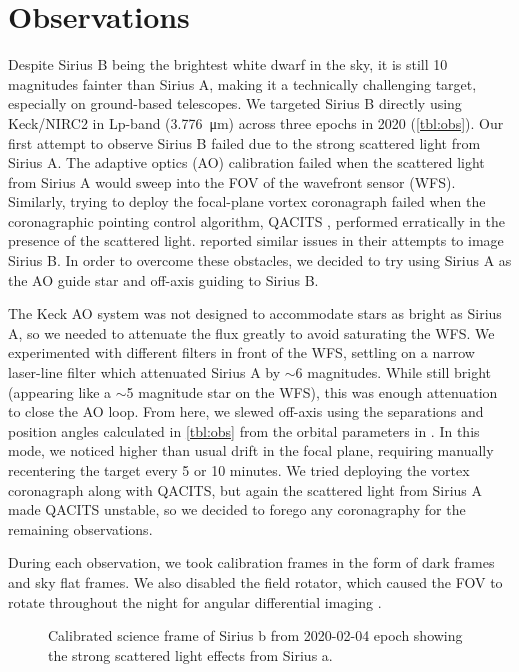 \documentclass[twocolumn]{aastex631}
\begin{document}
\section{Observations} \label{sec:obs}

Despite Sirius B being the brightest white dwarf in the sky, it is still 10 magnitudes fainter than Sirius A, making it a technically challenging target, especially on ground-based telescopes. We targeted Sirius B directly using Keck/NIRC2 in Lp-band (\qty{3.776}{\micro\meter}) across three epochs in 2020 (\autoref{tbl:obs}). Our first attempt to observe Sirius B failed due to the strong scattered light from Sirius A. The adaptive optics (AO) calibration failed when the scattered light from Sirius A would sweep into the FOV of the wavefront sensor (WFS). Similarly, trying to deploy the focal-plane vortex coronagraph \citep{serabyn_w_2017} failed when the coronagraphic pointing control algorithm, QACITS \citep{huby_w_2017}, performed erratically in the presence of the scattered light. \citet[\S2]{vigan_high-contrast_2015} reported similar issues in their attempts to image Sirius B. In order to overcome these obstacles, we decided to try using Sirius A as the AO guide star and off-axis guiding to Sirius B.

The Keck AO system \citep{wizinowich_performance_2000} was not designed to accommodate stars as bright as Sirius A, so we needed to attenuate the flux greatly to avoid saturating the WFS. We experimented with different filters in front of the WFS, settling on a narrow laser-line filter which attenuated Sirius A by $\sim$6 magnitudes. While still bright (appearing like a $\sim$5 magnitude star on the WFS), this was enough attenuation to close the AO loop. From here, we slewed off-axis using the separations and position angles calculated in \autoref{tbl:obs} from the orbital parameters in \cite{bond_sirius_2017}. In this mode, we noticed higher than usual drift in the focal plane, requiring manually recentering the target every 5 or 10 minutes. We tried deploying the vortex coronagraph along with QACITS, but again the scattered light from Sirius A made QACITS unstable, so we decided to forego any coronagraphy for the remaining observations.

During each observation, we took calibration frames in the form of dark frames and sky flat frames. We also disabled the field rotator, which caused the FOV to rotate throughout the night for angular differential imaging \citep[ADI;][]{marois_angular_2006}.

\begin{figure}
    \centering
    \caption{Calibrated science frame of Sirius b from 2020-02-04 epoch showing the strong scattered light effects from Sirius a.}
    \label{fig:spike}
\end{figure}
\end{document}
